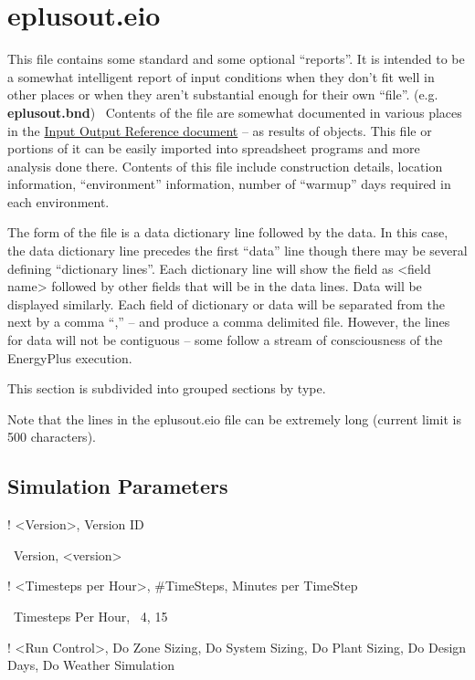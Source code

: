 \section{eplusout.eio}\label{eplusout.eio}

This file contains some standard and some optional ``reports''. It is intended to be a somewhat intelligent report of input conditions when they don't fit well in other places or when they aren't substantial enough for their own ``file''. (e.g. \textbf{eplusout.bnd})~ Contents of the file are somewhat documented in various places in the \href{file:///E:/Docs4PDFs/InputOutputReference.pdf}{Input Output Reference document} -- as results of objects. This file or portions of it can be easily imported into spreadsheet programs and more analysis done there. Contents of this file include construction details, location information, ``environment'' information, number of ``warmup'' days required in each environment.

The form of the file is a data dictionary line followed by the data. In this case, the data dictionary line precedes the first ``data'' line though there may be several defining ``dictionary lines''. Each dictionary line will show the field as \textless{}field name\textgreater{} followed by other fields that will be in the data lines. Data will be displayed similarly. Each field of dictionary or data will be separated from the next by a comma ``,'' -- and produce a comma delimited file. However, the lines for data will not be contiguous -- some follow a stream of consciousness of the EnergyPlus execution.

This section is subdivided into grouped sections by type.

Note that the lines in the eplusout.eio file can be extremely long (current limit is 500 characters).

\subsection{Simulation Parameters}\label{simulation-parameters}

! \textless{}Version\textgreater{}, Version ID

~Version, \textless{}version\textgreater{}

! \textless{}Timesteps per Hour\textgreater{}, \#TimeSteps, Minutes per TimeStep

~Timesteps Per Hour,~ 4, 15

! \textless{}Run Control\textgreater{}, Do Zone Sizing, Do System Sizing, Do Plant Sizing, Do Design Days, Do Weather Simulation

